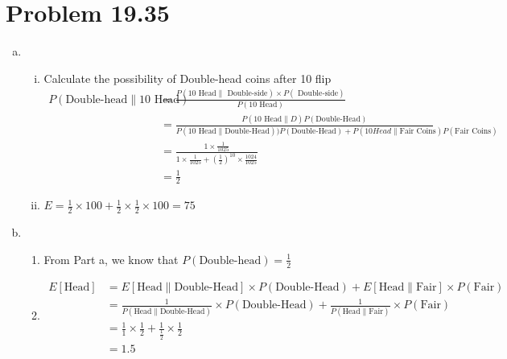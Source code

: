 \documentclass{article}
\def\math#1{$#1$}
\begin{document}
\section{Problem 19.35}
\begin{enumerate}[a)]
    \item 
        \begin{enumerate}[i)]
            \item Calculate the possibility of Double-head coins after 10 flip \begin{equation}
                    \begin{split}
                        P(\text{Double-head}\|\text{10 Head}) &= \frac{P( \text{10 Head}\|\text{ Double-side}) \times P(\text{ Double-side})}{P(\text{10 Head})} \\
                        &= \frac{P(\text{10 Head}\|D) P(\text{Double-Head})}{P(\text{10 Head}\|\text{Double-Head}))P(\text{Double-Head}) + P({10 Head}\|\text{Fair Coins})P(\text{Fair Coins})} \\
                        &= \frac{1 \times \frac{1}{1025}}{1 \times \frac{1}{1025} + (\frac{1}{2})^{10} \times \frac{1024}{1025}} \\
                        &= \frac{1}{2}
                    \end{split}
                \end{equation}
            \item \math{E = \frac{1}{2} \times 100 + \frac{1}{2} \times \frac{1}{2} \times 100 = 75}
        \end{enumerate}
    \item 
    \begin{enumerate}
        \item From Part a, we know that \math{P(\text{Double-head}) = \frac{1}{2}}
        \item 
        \begin{equation}
            \begin{split}
                E[\text{Head}] &= E[\text{Head}\|\text{Double-Head}] \times P(\text{Double-Head}) + E[\text{Head}\|\text{Fair}] \times P(\text{Fair}) \\
                &= \frac{1}{P(\text{Head}\|\text{Double-Head})} \times P(\text{Double-Head}) + \frac{1}{P(\text{Head}\|\text{Fair})} \times P(\text{Fair}) \\
                &= \frac{1}{1} \times \frac{1}{2} + \frac{1}{\frac{1}{2}} \times \frac{1}{2} \\
                &= 1.5
            \end{split}
        \end{equation}
    \end{enumerate}
\end{enumerate}
\end{document}
